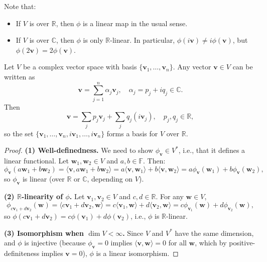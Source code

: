 \begin{remark}
Note that:
\begin{itemize}
    \item If \( V \) is over \( \mathbb{R} \), then \( \phi \) is a linear map in the usual sense.
    \item If \( V \) is over \( \mathbb{C} \), then \( \phi \) is only \(\mathbb{R}\)-linear. In particular, \( \phi(i\mathbf{v}) \neq i\phi(\mathbf{v}) \), but \( \phi(2\mathbf{v}) = 2\phi(\mathbf{v}) \).
\end{itemize}
\end{remark}

\begin{example}
Let \( V \) be a complex vector space with basis \( \{ \mathbf{v}_1, \ldots, \mathbf{v}_n \} \). Any vector \( \mathbf{v} \in V \) can be written as
\[
\mathbf{v} = \sum_{j=1}^n \alpha_j \mathbf{v}_j, \quad \alpha_j = p_j + iq_j \in \mathbb{C}.
\]
Then
\[
\mathbf{v} = \sum_j p_j \mathbf{v}_j + \sum_j q_j (i \mathbf{v}_j), \quad p_j, q_j \in \mathbb{R},
\]
so the set \( \{ \mathbf{v}_1, \ldots, \mathbf{v}_n, i\mathbf{v}_1, \ldots, i\mathbf{v}_n \} \) forms a basis for \( V \) over \( \mathbb{R} \).
\end{example}

\begin{proof}
\textbf{(1) Well-definedness.}  
We need to show \( \phi_{\mathbf{v}} \in V^* \), i.e., that it defines a linear functional. Let \( \mathbf{w}_1, \mathbf{w}_2 \in V \) and \( a, b \in \mathbb{F} \). Then:
\[
\phi_{\mathbf{v}}(a\mathbf{w}_1 + b\mathbf{w}_2) = \langle \mathbf{v}, a\mathbf{w}_1 + b\mathbf{w}_2 \rangle = a \langle \mathbf{v}, \mathbf{w}_1 \rangle + b \langle \mathbf{v}, \mathbf{w}_2 \rangle = a \phi_{\mathbf{v}}(\mathbf{w}_1) + b \phi_{\mathbf{v}}(\mathbf{w}_2),
\]
so \( \phi_{\mathbf{v}} \) is linear (over \( \mathbb{R} \) or \( \mathbb{C} \), depending on \( V \)).

\textbf{(2) \(\mathbb{R}\)-linearity of \( \phi \).}  
Let \( \mathbf{v}_1, \mathbf{v}_2 \in V \) and \( c, d \in \mathbb{R} \). For any \( \mathbf{w} \in V \),
\[
\phi_{c\mathbf{v}_1 + d\mathbf{v}_2}(\mathbf{w}) = \langle c\mathbf{v}_1 + d\mathbf{v}_2, \mathbf{w} \rangle = c \langle \mathbf{v}_1, \mathbf{w} \rangle + d \langle \mathbf{v}_2, \mathbf{w} \rangle = c \phi_{\mathbf{v}_1}(\mathbf{w}) + d \phi_{\mathbf{v}_2}(\mathbf{w}),
\]
so \( \phi(c\mathbf{v}_1 + d\mathbf{v}_2) = c\phi(\mathbf{v}_1) + d\phi(\mathbf{v}_2) \), i.e., \( \phi \) is \(\mathbb{R}\)-linear.

\textbf{(3) Isomorphism when \(\dim V < \infty\).}  
Since \( V \) and \( V^* \) have the same dimension, and \( \phi \) is injective (because \( \phi_{\mathbf{v}} = 0 \) implies \( \langle \mathbf{v}, \mathbf{w} \rangle = 0 \) for all \( \mathbf{w} \), which by positive-definiteness implies \( \mathbf{v} = 0 \)), \( \phi \) is a linear isomorphism.
\end{proof}

